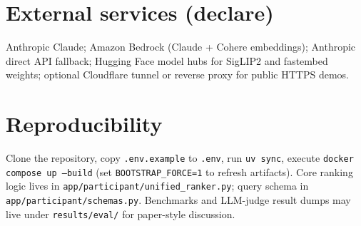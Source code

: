 \documentclass[11pt]{article}
\begin{document}
\section{External services (declare)}

Anthropic Claude; Amazon Bedrock (Claude + Cohere embeddings); Anthropic direct API fallback; Hugging Face model hubs for SigLIP2 and fastembed weights; optional Cloudflare tunnel or reverse proxy for public HTTPS demos.

\section{Reproducibility}

Clone the repository, copy \texttt{.env.example} to \texttt{.env}, run \texttt{uv sync}, execute \texttt{docker compose up --build} (set \texttt{BOOTSTRAP\_FORCE=1} to refresh artifacts). Core ranking logic lives in \texttt{app/participant/unified\_ranker.py}; query schema in \texttt{app/participant/schemas.py}. Benchmarks and LLM-judge result dumps may live under \texttt{results/eval/} for paper-style discussion.
\end{document}
